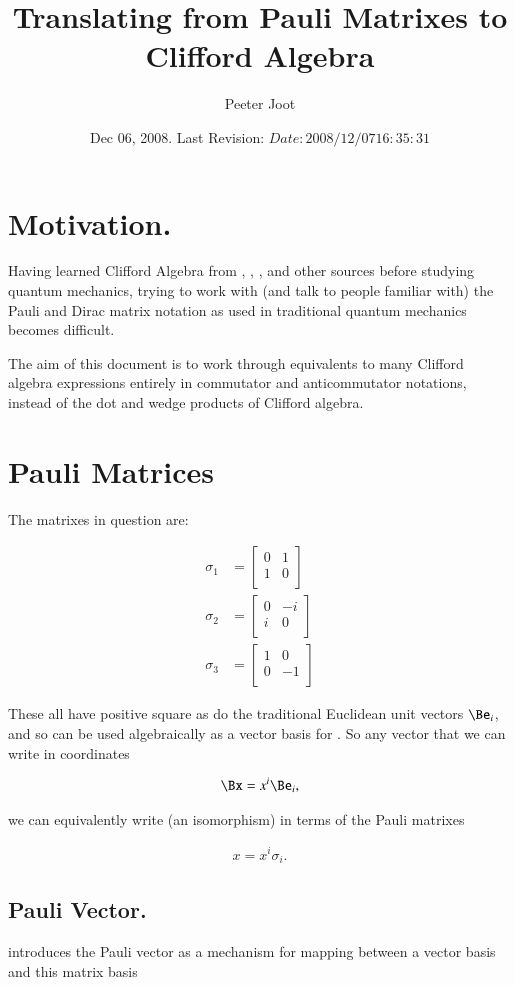 \documentclass{article}
\title{Translating from Pauli Matrixes to Clifford Algebra}
\author{Peeter Joot}
\date{ Dec 06, 2008.  Last Revision: $Date: 2008/12/07 16:35:31 $ }
\newcommand{\PauliX}[0]{
\begin{bmatrix}
0 & 1 \\
1 & 0 \\
\end{bmatrix}
}
\newcommand{\PauliY}[0]{
\begin{bmatrix}
0 & -i \\
i & 0 \\
\end{bmatrix}
}
\newcommand{\PauliZ}[0]{
\begin{bmatrix}
1 & 0 \\
0 & -1 \\
\end{bmatrix}
}
\begin{document}
\maketitle{}

\tableofcontents

\section{ Motivation. }

Having learned Clifford Algebra from 
\cite{doran2003gap}, \cite{hestenes1999nfc}, \cite{dorst2007gac}, and other sources
before studying quantum mechanics, trying to work with (and talk to people familiar with) the Pauli and Dirac matrix notation as used in
traditional quantum mechanics becomes difficult.

The aim of this document is to work through equivalents to many Clifford algebra expressions entirely in
commutator and anticommutator notations, instead of the dot and wedge products of Clifford algebra.

\section{ Pauli Matrices }

The matrixes in question are:

\begin{align}
\sigma_1 &= \PauliX \\
\sigma_2 &= \PauliY \\
\sigma_3 &= \PauliZ
\end{align}

These all have positive square as do the traditional Euclidean unit vectors $\Be_i$, and so can be used algebraically as a vector basis for .  So any vector that we
can write in coordinates

\begin{align*}
\Bx = x^i \Be_i,
\end{align*}

we can equivalently write (an isomorphism) in terms of the Pauli matrixes

\begin{align}\label{eqn:vectorInPauliBasis}
x = x^i \sigma_i.
\end{align}

\subsection{ Pauli Vector. }
\cite{wikipauli} introduces the Pauli vector as a mechanism for mapping between a vector basis and this matrix basis
\end{document}
